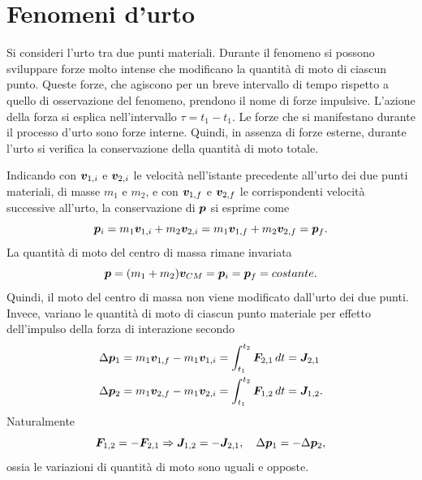 \chapter{Fenomeni d'urto}
Si consideri l'urto tra due punti materiali. Durante il fenomeno si possono sviluppare forze molto intense che modificano la quantità di moto di ciascun punto. Queste forze, che agiscono per un breve intervallo di tempo rispetto a quello di osservazione del fenomeno, prendono il nome di forze impulsive. L'azione della forza si esplica nell'intervallo $\tau=t_1-t_1$. Le forze che si manifestano durante il processo d'urto sono forze interne. Quindi, in assenza di forze esterne, durante l'urto si verifica la conservazione della quantità di moto totale.

Indicando con $\bm{v}_{1,i}$ e $\bm{v}_{2,i}$ le velocità nell'istante precedente all'urto dei due punti materiali, di masse $m_1$ e $m_2$, e con $\bm{v}_{1,f}$ e $\bm{v}_{2,f}$ le corrispondenti velocità successive all'urto, la conservazione di $\bm{p}$ si esprime come
\begin{equation}
    \bm{p}_i=m_1\bm{v}_{1,i}+m_2\bm{v}_{2,i}=m_1\bm{v}_{1,f}+m_2\bm{v}_{2,f}=\bm{p}_f.
\end{equation}
La quantità di moto del centro di massa rimane invariata
\begin{equation}
\label{eq: conservazione impulso CM urto 2 punti}
    \bm{p}=(m_1+m_2)\bm{v}_{CM}=\bm{p}_i=\bm{p}_f=costante.
\end{equation}
Quindi, il moto del centro di massa non viene modificato dall'urto dei due punti. Invece, variano le quantità di moto di ciascun punto materiale per effetto dell'impulso della forza di interazione secondo
\begin{align}
    \Delta\bm{p}_1&=m_1\bm{v}_{1,f}-m_1\bm{v}_{1,i}=\int_{t_1}^{t_2}\bm{F}_{2,1}\,dt=\bm{J}_{2,1} \\
    \Delta\bm{p}_2&=m_1\bm{v}_{2,f}-m_1\bm{v}_{2,i}=\int_{t_1}^{t_2}\bm{F}_{1,2}\,dt=\bm{J}_{1,2}.
\end{align}
Naturalmente
\begin{equation}
    \bm{F}_{1,2}=-\bm{F}_{2,1}\Rightarrow\bm{J}_{1,2}=-\bm{J}_{2,1},\quad\Delta\bm{p}_1=-\Delta\bm{p}_2,
\end{equation}
ossia le variazioni di quantità di moto sono uguali e opposte. 


